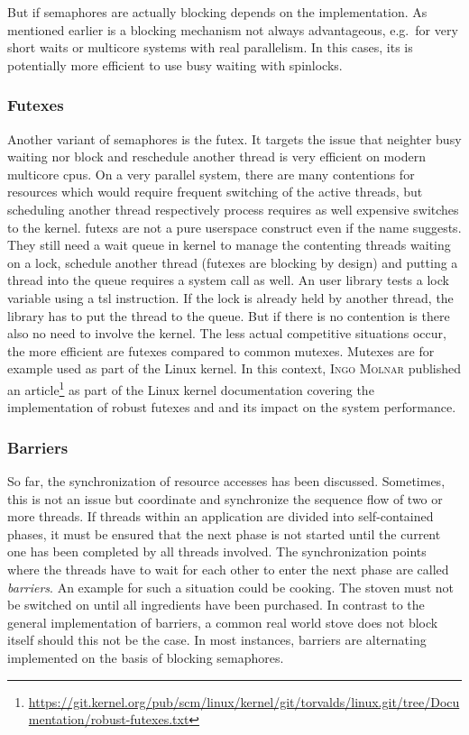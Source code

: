 But if semaphores are actually blocking depends on the implementation.
As mentioned earlier is a blocking mechanism not always advantageous, e.g.\ for very short waits or multicore systems with real parallelism.
In this cases, its is potentially more efficient to use busy waiting with spinlocks\cite{glatz2015betriebssysteme}.

\subsubsection*{Futexes}
Another variant of semaphores is the \ac{futex}. 
It targets the issue that neighter busy waiting nor block and reschedule another thread is very efficient on modern multicore \acp{cpu}.
On a very parallel system, there are many contentions for resources which would require frequent switching of the active threads, but scheduling another thread respectively process requires as well expensive switches to the kernel\cite{tanenbaum-modern-operating-systems}.
\acp{futex} are not a pure userspace construct even if the name suggests. 
They still need a wait queue in kernel to manage the contenting threads waiting on a lock, schedule another thread (futexes are blocking by design) and putting a thread into the queue requires a system call as well.
An user library tests a lock variable using a \ac{tsl} instruction.
If the lock is already held by another thread, the library has to put the thread to the queue.
But if there is no contention is there also no need to involve the kernel\cite{tanenbaum-modern-operating-systems}.
The less actual competitive situations occur, the more efficient are futexes compared to common mutexes.
Mutexes are for example used as part of the Linux kernel. 
In this context, \textsc{Ingo Molnar} published an article\footnote{\url{https://git.kernel.org/pub/scm/linux/kernel/git/torvalds/linux.git/tree/Documentation/robust-futexes.txt}} as part of the Linux kernel documentation covering the implementation of robust futexes and and its impact on the system performance.

\subsubsection*{Barriers}
So far, the synchronization of resource accesses has been discussed.
Sometimes, this is not an issue but coordinate and synchronize the sequence flow of two or more threads.
If threads within an application are divided into self-contained phases, it must be ensured that the next phase is not started until the current one has been completed by all threads involved\cite{tanenbaum-modern-operating-systems}.
The synchronization points where the threads have to wait for each other to enter the next phase are called \textit{barriers}.
An example for such a situation could be cooking.
The stoven must not be switched on until all ingredients have been purchased.
In contrast to the general implementation of barriers, a common real world stove does not block itself should this not be the case.
In most instances, barriers are alternating implemented on the basis of blocking semaphores\cite{glatz2015betriebssysteme}.



